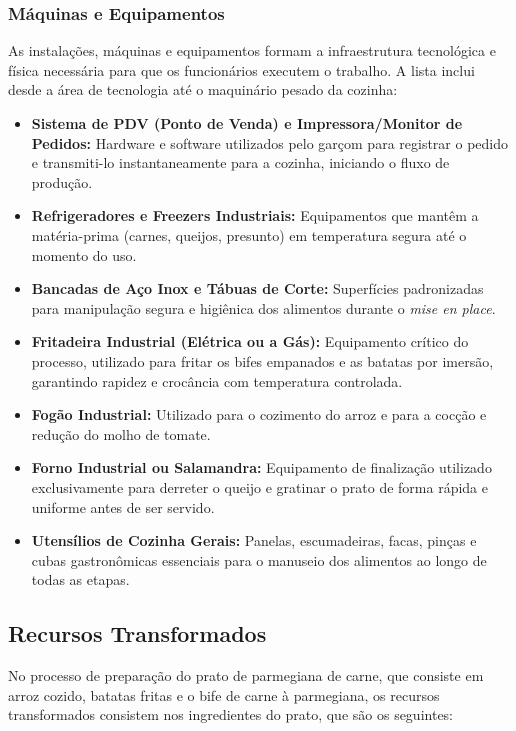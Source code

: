 \documentclass[12pt, a4paper]{article}
\begin{document}
\subsubsection*{Máquinas e Equipamentos}

As instalações, máquinas e equipamentos formam a infraestrutura tecnológica e física necessária para que os funcionários executem o trabalho. A lista inclui desde a área de tecnologia até o maquinário pesado da cozinha:

\begin{itemize}
    \item \textbf{Sistema de PDV (Ponto de Venda) e Impressora/Monitor de Pedidos:} Hardware e software utilizados pelo garçom para registrar o pedido e transmiti-lo instantaneamente para a cozinha, iniciando o fluxo de produção.
    \item \textbf{Refrigeradores e Freezers Industriais:} Equipamentos que mantêm a matéria-prima (carnes, queijos, presunto) em temperatura segura até o momento do uso.
    \item \textbf{Bancadas de Aço Inox e Tábuas de Corte:} Superfícies padronizadas para manipulação segura e higiênica dos alimentos durante o \textit{mise en place}.
    \item \textbf{Fritadeira Industrial (Elétrica ou a Gás):} Equipamento crítico do processo, utilizado para fritar os bifes empanados e as batatas por imersão, garantindo rapidez e crocância com temperatura controlada.
    \item \textbf{Fogão Industrial:} Utilizado para o cozimento do arroz e para a cocção e redução do molho de tomate.
    \item \textbf{Forno Industrial ou Salamandra:} Equipamento de finalização utilizado exclusivamente para derreter o queijo e gratinar o prato de forma rápida e uniforme antes de ser servido.
    \item \textbf{Utensílios de Cozinha Gerais:} Panelas, escumadeiras, facas, pinças e cubas gastronômicas essenciais para o manuseio dos alimentos ao longo de todas as etapas.
\end{itemize}

\subsection{Recursos Transformados}
No processo de preparação do prato de parmegiana de carne, que consiste em arroz cozido, batatas fritas e o bife de carne à parmegiana, os recursos transformados consistem nos ingredientes do prato, que são os seguintes:
\end{document}
